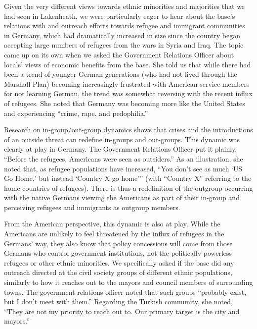 Given the very different views towards ethnic minorities and majorities that we had seen in Lakenheath, we were particularly eager to hear about the base's relations with and outreach efforts towards refugee and immigrant communities in Germany, which had dramatically increased in size since the country began accepting large numbers of refugees from the wars in Syria and Iraq. The topic came up on its own when we asked the Government Relations Officer about locals' views of economic benefits from the base. She told us that while there had been a trend of younger German generations (who had not lived through the Marshall Plan) becoming increasingly frustrated with American service members for not learning German, the trend was somewhat reversing with the recent influx of refugees. She noted that Germany was becoming more like the United States and experiencing ``crime, rape, and pedophilia.''\cite{kaserneone20190725} 


Research on in-group/out-group dynamics shows that crises and the introductions of an outside threat can redefine in-groups and out-groups.\cite{Coser1998,Levy1989,Simmel2010} This dynamic was clearly at play in Germany. The Government Relations Officer put it plainly, ``Before the refugees, Americans were seen as outsiders.'' As an illustration, she noted that, as refugee populations have increased, ``You don't see as much `US Go Home,' but instead `Country X go home''' (with ``Country X'' referring to the home countries of refugees).\cite{kaserneone20190725} There is thus a redefinition of the outgroup occurring with the native Germans viewing the Americans as part of their in-group and perceiving refugees and immigrants as outgroup members.

From the American perspective, this dynamic is also at play. While the Americans are unlikely to feel threatened by the influx of refugees in the Germans' way, they also know that policy concessions will come from those Germans who control government institutions, not the politically powerless refugees or other ethnic minorities. We specifically asked if the base did any outreach directed at the civil society groups of different ethnic populations, similarly to how it reaches out to the mayors and council members of surrounding towns. The government relations officer noted that such groups ``probably exist, but I don't meet with them.'' Regarding the Turkish community, she noted, ``They are not my priority to reach out to. Our primary target is the city and mayors.''\cite{kaserneone20190725}

